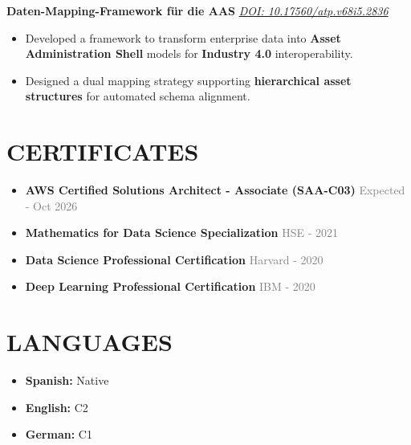 \documentclass[a4paper]{article}
\newcommand{\entrytitle}[1]{{\fontsize{12pt}{13.2pt}\selectfont\textbf{#1}}}
\begin{document}
\vspace{0.1cm}
\entrytitle{Daten-Mapping-Framework für die AAS} \hfill {\small \textcolor{graytext}{\textit{\href{https://doi.org/10.17560/atp.v68i5.2836}{DOI: 10.17560/atp.v68i5.2836}}}}
\begin{itemize}
  \item Developed a framework to transform enterprise data into \textbf{Asset Administration Shell} models for \textbf{Industry 4.0} interoperability.
  \item Designed a dual mapping strategy supporting \textbf{hierarchical asset structures} for automated schema alignment.
\end{itemize}

\begin{minipage}[t]{0.62\textwidth}
  \section*{CERTIFICATES}
  \begin{itemize}
    \item \textbf{AWS Certified Solutions Architect - Associate (SAA-C03)} {\small \textcolor{graytext}{Expected - Oct 2026}}
    \item \textbf{Mathematics for Data Science Specialization} {\small \textcolor{graytext}{HSE - 2021}}
    \item \textbf{Data Science Professional Certification} {\small \textcolor{graytext}{Harvard - 2020}}
    \item \textbf{Deep Learning Professional Certification} {\small \textcolor{graytext}{IBM - 2020}}
  \end{itemize}
\end{minipage}
\hfill
\begin{minipage}[t]{0.33\textwidth}
  \section*{LANGUAGES}
  \begin{itemize}
    \item \textbf{Spanish:} Native
    \item \textbf{English:} C2
    \item \textbf{German:} C1
  \end{itemize}
\end{minipage}
\end{document}
